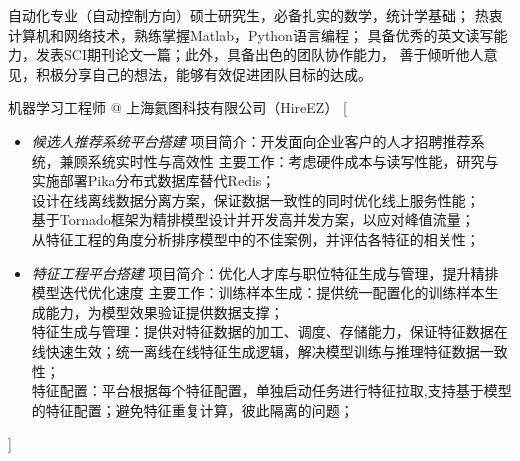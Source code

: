\documentclass[zh]{resume}
\begin{document}
\makeheader

{\onehalfspacing\hspace{2em}%
自动化专业（自动控制方向）硕士研究生，必备扎实的数学，统计学基础；
热衷计算机和网络技术，熟练掌握Matlab，Python语言编程；
具备优秀的英文读写能力，发表SCI期刊论文一篇；此外，具备出色的团队协作能力，
善于倾听他人意见，积极分享自己的想法，能够有效促进团队目标的达成。

\begin{experiences}
    {机器学习工程师 @ 上海氦图科技有限公司（HireEZ）}%
    [\begin{itemize}
            \item \emph{候选人推荐系统平台搭建}
                  \subitem 项目简介：开发面向企业客户的人才招聘推荐系统，兼顾系统实时性与高效性
                  \subitem 主要工作：考虑硬件成本与读写性能，研究与实施部署Pika分布式数据库替代Redis；\\
                  设计在线离线数据分离方案，保证数据一致性的同时优化线上服务性能；\\
                  基于Tornado框架为精排模型设计并开发高并发方案，以应对峰值流量；\\
                  从特征工程的角度分析排序模型中的不佳案例，并评估各特征的相关性；
            \item \emph{特征工程平台搭建}
                  \subitem 项目简介：优化人才库与职位特征生成与管理，提升精排模型迭代优化速度
                  \subitem 主要工作：训练样本生成：提供统一配置化的训练样本生成能力，为模型效果验证提供数据支撑；\\
                  特征生成与管理：提供对特征数据的加工、调度、存储能力，保证特征数据在线快速生效；统一离线在线特征生成逻辑，解决模型训练与推理特征数据一致性；\\
                  特征配置：平台根据每个特征配置，单独启动任务进行特征拉取,支持基于模型的特征配置；避免特征重复计算，彼此隔离的问题；\\
        \end{itemize}]


\end{experiences}}
\end{document}
